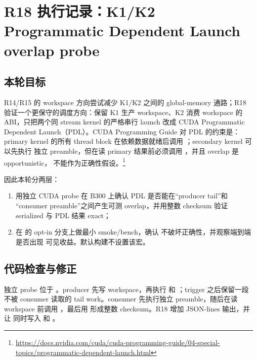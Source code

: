 \section{R18 执行记录：K1/K2 Programmatic Dependent Launch overlap probe}

\subsection{本轮目标}

R14/R15 的 workspace 方向尝试减少 K1/K2 之间的 global-memory 通路；R18
验证一个更保守的调度方向：保留 K1 生产 workspace、K2 消费 workspace 的
ABI，只把两个同 stream kernel 的严格串行 launch 改成 CUDA Programmatic
Dependent Launch（PDL）。CUDA Programming Guide 对 PDL 的约束是：primary
kernel 的所有 thread block 在依赖数据就绪后调用
；secondary kernel 可以先执行
独立 preamble，但在读 primary 结果前必须调用
，并且 overlap 是 opportunistic，
不能作为正确性假设。\footnote{\url{https://docs.nvidia.com/cuda/cuda-programming-guide/04-special-topics/programmatic-dependent-launch.html}}

因此本轮分两层：

\begin{enumerate}
  \item 用独立 CUDA probe 在 B300 上确认 PDL 是否能在“producer tail”和
        “consumer preamble”之间产生可测 overlap，并用整数 checksum 验证
        serialized 与 PDL 结果 exact；
  \item 在 \FlashKDA{} 的 opt-in 分支上做最小 smoke/bench，确认
         不破坏正确性，并观察端到端是否出现
        可见收益。默认构建不设置该宏。
\end{enumerate}

\subsection{代码检查与修正}

独立 probe 位于 。producer 先写
workspace，再执行  和
；trigger 之后保留一段
不被 consumer 读取的 tail work。consumer 先执行独立 preamble，随后在读
workspace 前调用 ，最后用
 形成整数 checksum。R18 增加 JSON-lines 输出，并让
 同时写入
 和
。

